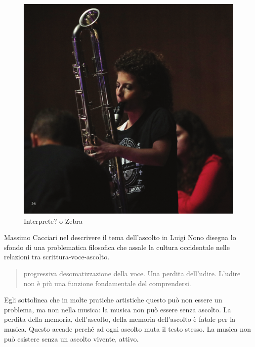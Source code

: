 \documentclass{gs-adonis}
\begin{document}
\begin{figure}[t]
  \centering
  \includegraphics[width=\linewidth]{images/panthera.pdf}
  \captionsetup{width=.81\linewidth}
  \caption{Interprete? o Zebra}
  \label{alice}
\end{figure}

Massimo Cacciari nel descrivere il tema dell'ascolto in Luigi Nono
\cite{Cacciari1995} disegna lo sfondo di una problematica filosofica che assale
la cultura occidentale nelle relazioni tra scrittura-voce-ascolto. %

\begin{quote}
  progressiva desomatizzazione della voce. Una perdita dell'udire. L'udire
  non è più una funzione fondamentale del comprendersi. \cite{Cacciari1995}
\end{quote}

Egli sottolinea che in molte pratiche artistiche questo può non essere un
problema, ma non nella musica: la musica non può essere senza ascolto.
La perdita della memoria, dell'ascolto, della memoria dell'ascolto è fatale
per la musica. Questo accade perché ad ogni ascolto muta il testo stesso.
La musica non può esistere senza un ascolto vivente, attivo.
\end{document}
